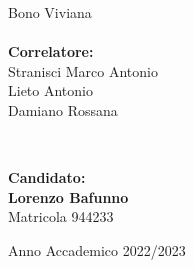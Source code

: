 \begin{titlepage}
\begin{minipage}[t]{0.47\textwidth}
{            Bono Viviana}\\
        \vspace{4mm}
        \\
        {\large{\bf Correlatore:}\\
        Stranisci Marco Antonio\\
        Lieto Antonio\\
        Damiano Rossana
        }
    \end{minipage}
    \\
    \null\hfill
    \begin{minipage}[t]{0.40\textwidth}
        \vspace{20mm}
        {\large{\bf Candidato:\\
                Lorenzo Bafunno\\
            } \large{Matricola 944233}}
    \end{minipage}
    \vspace{10mm}
    \begin{center}
        {\large{Anno Accademico 2022/2023}}
    \end{center}

\end{titlepage}